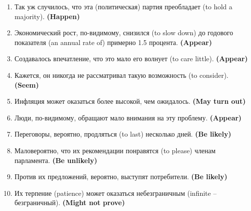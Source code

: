 \documentclass[main.tex]{subfiles}
\begin{document}

\begin{enumerate}[nosep,leftmargin=*]
	\itemsep\eitsp
	\item Так уж случилось, что эта (политическая) партия преобладает (to hold a majority). \textbf{(Happen)}
	\item Экономический рост, по-видимому, снизился (to slow down) до годового показателя (an annual rate of) примерно 1.5 процента. \textbf{(Appear)}
	\item Создавалось впечатление, что это мало его волнует (to care little). \textbf{(Appear)}
	\item Кажется, он никогда не рассматривал такую возможность (to consider). \textbf{(Seem)}
	\item Инфляция может оказаться более высокой, чем ожидалось. \textbf{(May turn out)}
	\item Люди, по-видимому, обращают мало внимания на эту проблему. \textbf{(Appear)}
	\item Переговоры, вероятно, продляться (to last) несколько дней. \textbf{(Be likely)}
	\item Маловероятно, что их рекомендации понравятся (to please) членам парламента. \textbf{(Be unlikely)}
	\item Против их предложений, вероятно, выступят потребители. \textbf{(Be likely)}
	\item Их терпение (patience) может оказаться небезграничным (infinite -- безграничный). \textbf{(Might not prove)}
\end{enumerate}

\newpage
\setcounter{subsection}{9}

\end{document}
